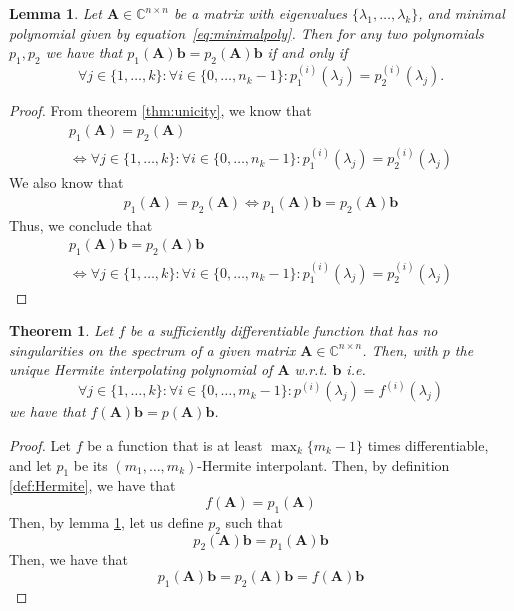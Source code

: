 \documentclass[11pt]{article}
\newtheorem{lemma}{Lemma}
\newtheorem{theorem}{Theorem}
\numberwithin{equation}{section}
\begin{document}

\begin{lemma}\label{lem:phiAb}
    Let $\mathbf{A}\in \mathbb{C}^{n\times n}$ be a matrix with eigenvalues $\{\lambda_1,\ldots,\lambda_k\}$, and minimal polynomial given by equation~\ref{eq:minimalpoly}. Then for any two polynomials $p_1,p_2$ we have that $p_1(\mathbf{A})\mathbf{b}=p_2(\mathbf{A})\mathbf{b}$ if and only if 
$$\forall j\in\{1,\ldots,k\}:\forall i\in\{0,\ldots,n_k-1\}: p_1^{(i)}(\lambda_j)=p_2^{(i)}(\lambda_j).$$
\end{lemma}

\begin{proof}
    From theorem \ref{thm:unicity}, we know that
    \begin{align*}
        p_1(\mathbf{A}) = p_2(\mathbf{A}) \\ \Leftrightarrow \forall j\in\{1,\ldots,k\}:\forall i\in\{0,\ldots,n_k-1\}: p_1^{(i)}(\lambda_j)=p_2^{(i)}(\lambda_j)
    \end{align*}
    We also know that 
    \begin{align*}
        p_1(\mathbf{A}) = p_2(\mathbf{A}) \Leftrightarrow p_1(\mathbf{A})\mathbf{b} = p_2(\mathbf{A})\mathbf{b}
    \end{align*}
    Thus, we conclude that
    \begin{align*}
        p_1(\mathbf{A})\mathbf{b} = p_2(\mathbf{A})\mathbf{b} \\ \Leftrightarrow \forall j\in\{1,\ldots,k\}:\forall i\in\{0,\ldots,n_k-1\}: p_1^{(i)}(\lambda_j)=p_2^{(i)}(\lambda_j)
    \end{align*}
\end{proof}


\begin{theorem}\label{thm:KrylovApprox}
    Let $f$ be a sufficiently differentiable function that has no singularities on the spectrum of a given matrix $\mathbf{A}\in\mathbb{C}^{n \times n}$. Then, with $p$ the unique Hermite interpolating polynomial of $\mathbf{A}$ w.r.t. $\mathbf{b}$ i.e. 
    $$\forall j\in\{1,\ldots,k\}:\forall i\in\{0,\ldots,m_k-1\}:p^{(i)}(\lambda_j)=f^{(i)}(\lambda_j)$$
    we have that $f(\mathbf{A})\mathbf{b}=p(\mathbf{A})\mathbf{b}$.
\end{theorem}

\begin{proof}
    Let $f$ be a function that is at least $\max_k\{m_k-1\}$ times differentiable, and let $p_1$ be its $(m_1,\ldots,m_k)$-Hermite interpolant. Then, by definition \ref{def:Hermite}, we have that 
    \begin{equation*}
        f(\mathbf{A}) = p_1(\mathbf{A})
    \end{equation*}
    Then, by lemma \ref{lem:phiAb}, let us define $p_2$ such that
    \begin{equation*}
        p_2(\mathbf{A})\mathbf{b} = p_1(\mathbf{A})\mathbf{b}
    \end{equation*}
    Then, we have that
    \begin{equation*}
        p_1(\mathbf{A})\mathbf{b} = p_2(\mathbf{A})\mathbf{b} = f(\mathbf{A})\mathbf{b}
    \end{equation*}
\end{proof}
\end{document}
